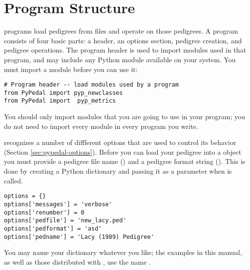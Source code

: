\section{Program Structure}
\label{sec:overview-program-structure}
\PyPedal{} programs load pedigrees from files and operate on those pedigrees.  A program consists of four basic parts: a header, an options section, pedigree creation, and pedigree operations.  The program header is used to import modules used in that program, and may include any Python module available on your system.  You must import a module before you can use it:
\begin{verbatim}
# Program header -- load modules used by a program
from PyPedal import pyp_newclasses
from PyPedal import  pyp_metrics
\end{verbatim}
You should only import modules that you are going to use in your program; you do not need to import every \PyPedal{} module in every program you write.

\PyPedal{} recognizes a number of diffferent options that are used to control its behavior (Section \ref{sec:pypedal-options}).  Before you can load your pedigree into a \PyPedal{} object you must provide a pedigree file name () and a pedigree format string ().  This is done by creating a Python dictionary and passing it as a parameter when  is called.
\begin{verbatim}
options = {}
options['messages'] = 'verbose'
options['renumber'] = 0
options['pedfile'] = 'new_lacy.ped'
options['pedformat'] = 'asd'
options['pedname'] = 'Lacy (1989) Pedigree'
\end{verbatim}
You may name your dictionary whatever you like; the examples in this manual, as well as those distributed with \PyPedal{}, use the name .

